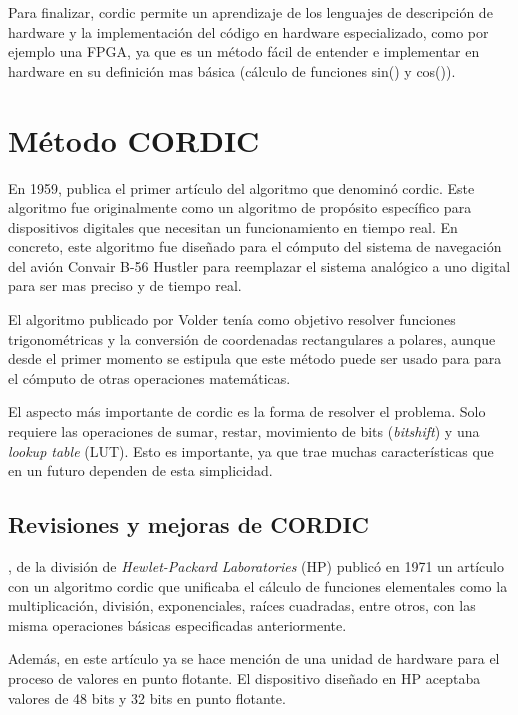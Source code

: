 Para finalizar, \gls{cordic} permite un aprendizaje de los lenguajes de descripción de hardware y la implementación del código en hardware especializado, como por ejemplo una FPGA, ya que es un método fácil de entender e implementar en hardware en su definición mas básica (cálculo de funciones sin() y cos()).

\section{Método CORDIC}

En 1959, \citeauthor{volder_cordic_1959} publica el primer artículo del algoritmo que denominó \gls{cordic}. Este algoritmo fue originalmente como un algoritmo de propósito específico para dispositivos digitales que necesitan un funcionamiento en tiempo real. En concreto, este algoritmo fue diseñado para el cómputo del sistema de navegación del avión Convair B-56 Hustler para reemplazar el sistema analógico a uno digital para ser mas preciso y de tiempo real. 

El algoritmo publicado por Volder tenía como objetivo resolver funciones trigonométricas y la conversión de coordenadas rectangulares a polares, aunque desde el primer momento se estipula que este método puede ser usado para para el cómputo de otras operaciones matemáticas.

El aspecto más importante de \gls{cordic} es la forma de resolver el problema. Solo requiere las operaciones de sumar, restar, movimiento de bits (\textit{bitshift}) y una \textit{lookup table} (LUT). Esto es importante, ya que trae muchas características que en un futuro dependen de esta simplicidad.


\subsection{Revisiones y mejoras de CORDIC}

\cite{walther_unified_1971}, de la división de \textit{Hewlet-Packard Laboratories} (HP) publicó en 1971 un artículo con un algoritmo \gls{cordic} que unificaba el cálculo de funciones elementales como la multiplicación, división, exponenciales, raíces cuadradas, entre otros, con las misma operaciones básicas especificadas anteriormente.

Además, en este artículo ya se hace mención de una unidad de hardware para el proceso de valores en punto flotante. El dispositivo diseñado en HP aceptaba valores de 48 bits y 32 bits en punto flotante.

